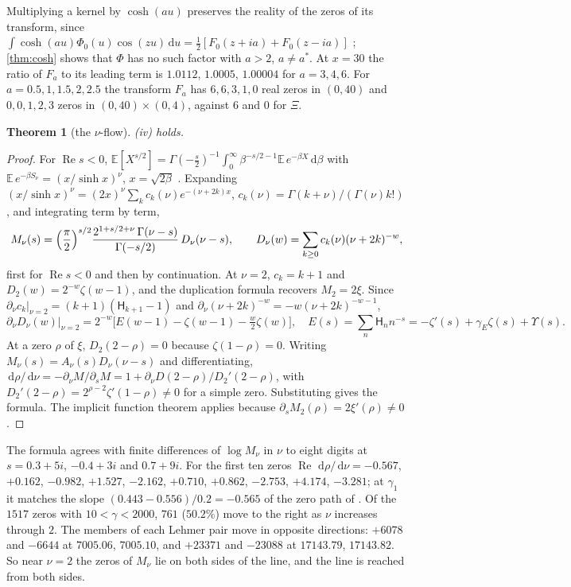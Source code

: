 \documentclass[11pt]{article}
\newtheorem{theorem}{Theorem}[section]
\theoremstyle{definition}\newtheorem{definition}[theorem]{Definition}
\theoremstyle{remark}\newtheorem{remark}[theorem]{Remark}
\newcommand{\dd}{\,\mathrm d}\newcommand{\e}{\mathrm e}
\renewcommand{\Re}{\operatorname{Re}}\renewcommand{\Im}{\operatorname{Im}}
\begin{document}
Multiplying a kernel by $\cosh(au)$ preserves the reality of the zeros of its transform, since $\int\cosh(au)\Phi_0(u)\cos(zu)\dd u=\frac12[F_0(z+ia)+F_0(z-ia)]$ \cite{deBruijn}; \cref{thm:cosh} shows that $\Phi$ has no such factor with $a>2$, $a\ne a^*$. At $x=30$ the ratio of $F_a$ to its leading term is $1.0112$, $1.0005$, $1.00004$ for $a=3,4,6$. For $a=0.5,1,1.5,2,2.5$ the transform $F_a$ has $6,6,3,1,0$ real zeros in $(0,40)$ and $0,0,1,2,3$ zeros in $(0,40)\times(0,4)$, against $6$ and $0$ for $\Xi$.

\begin{theorem}[the $\nu$-flow]\label{thm:nuflow}
(iv) holds.
\end{theorem}
\begin{proof}
For $\Re s<0$, $\mathbb E[X^{s/2}]=\Gamma(-\frac s2)^{-1}\int_0^\infty\beta^{-s/2-1}\mathbb E\,e^{-\beta X}\dd\beta$ with $\mathbb E\,e^{-\beta S_\nu}=(x/\sinh x)^\nu$, $x=\sqrt{2\beta}$ \cite{S01}. Expanding $(x/\sinh x)^\nu=(2x)^\nu\sum_kc_k(\nu)e^{-(\nu+2k)x}$, $c_k(\nu)=\Gamma(k+\nu)/(\Gamma(\nu)k!)$, and integrating term by term,
\[
M_\nu(s)=\Bigl(\frac\pi2\Bigr)^{s/2}\frac{2^{1+s/2+\nu}\,\Gamma(\nu-s)}{\Gamma(-s/2)}\,D_\nu(\nu-s),\qquad D_\nu(w)=\sum_{k\ge0}c_k(\nu)(\nu+2k)^{-w},
\]
first for $\Re s<0$ and then by continuation. At $\nu=2$, $c_k=k+1$ and $D_2(w)=2^{-w}\zeta(w-1)$, and the duplication formula recovers $M_2=2\xi$. Since $\partial_\nu c_k|_{\nu=2}=(k+1)(\mathsf H_{k+1}-1)$ and $\partial_\nu(\nu+2k)^{-w}=-w(\nu+2k)^{-w-1}$,
\[
\partial_\nu D_\nu(w)\big|_{\nu=2}=2^{-w}\bigl[E(w-1)-\zeta(w-1)-\tfrac w2\zeta(w)\bigr],\quad E(s)=\sum_n\mathsf H_nn^{-s}=-\zeta'(s)+\gamma_E\zeta(s)+\Upsilon(s).
\]
At a zero $\rho$ of $\xi$, $D_2(2-\rho)=0$ because $\zeta(1-\rho)=0$. Writing $M_\nu(s)=A_\nu(s)D_\nu(\nu-s)$ and differentiating, $\dd\rho/\dd\nu=-\partial_\nu M/\partial_sM=1+\partial_\nu D(2-\rho)/D_2'(2-\rho)$, with $D_2'(2-\rho)=2^{\rho-2}\zeta'(1-\rho)\ne0$ for a simple zero. Substituting gives the formula. The implicit function theorem applies because $\partial_sM_2(\rho)=2\xi'(\rho)\ne0$.
\end{proof}

The formula agrees with finite differences of $\log M_\nu$ in $\nu$ to eight digits at $s=0.3+5i$, $-0.4+3i$ and $0.7+9i$. For the first ten zeros $\Re\,\dd\rho/\dd\nu=-0.567$, $+0.162$, $-0.982$, $+1.527$, $-2.162$, $+0.710$, $+0.862$, $-2.753$, $+4.174$, $-3.281$; at $\gamma_1$ it matches the slope $(0.443-0.556)/0.2=-0.565$ of the zero path of \cite{S01}. Of the $1517$ zeros with $10<\gamma<2000$, $761$ ($50.2\%$) move to the right as $\nu$ increases through $2$. The members of each Lehmer pair move in opposite directions: $+6078$ and $-6644$ at $7005.06$, $7005.10$, and $+23371$ and $-23088$ at $17143.79$, $17143.82$. So near $\nu=2$ the zeros of $M_\nu$ lie on both sides of the line, and the line is reached from both sides.
\end{document}
